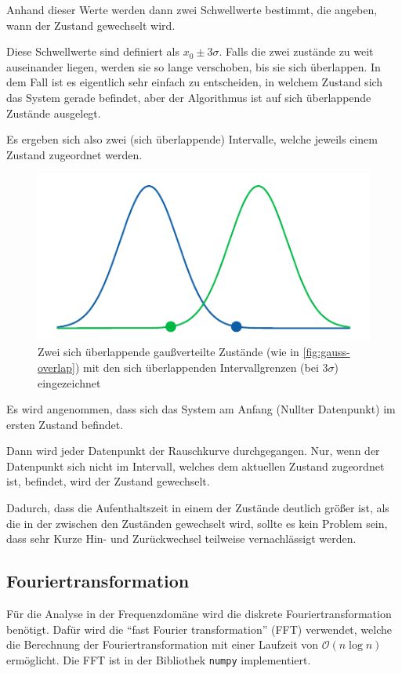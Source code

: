 \documentclass[main.tex]{subfiles}
\begin{document}
Anhand dieser Werte werden dann zwei Schwellwerte bestimmt, die angeben, wann der Zustand gewechselt wird.

Diese Schwellwerte sind definiert als \(x_0 \pm 3\sigma\). Falls die zwei zustände zu weit auseinander liegen, werden sie so lange verschoben, bis sie sich überlappen. 
In dem Fall ist es eigentlich sehr einfach zu entscheiden, in welchem Zustand sich das System gerade befindet, aber der Algorithmus ist auf sich überlappende Zustände ausgelegt.

Es ergeben sich also zwei (sich überlappende) Intervalle, welche jeweils einem Zustand zugeordnet werden.

\begin{figure}[h]
    \centering
    \includegraphics{bilder/plots/theo-vis/bounds.pdf}
    \caption{Zwei sich überlappende gaußverteilte Zustände (wie in \cref{fig:gauss-overlap}) mit den sich überlappenden Intervallgrenzen (bei \(3\sigma\)) eingezeichnet }
\end{figure}


Es wird angenommen, dass sich das System am Anfang (Nullter Datenpunkt) im ersten Zustand befindet.

Dann wird jeder Datenpunkt der Rauschkurve durchgegangen. Nur, wenn der Datenpunkt sich nicht im Intervall, welches dem aktuellen Zustand zugeordnet ist, befindet, wird der Zustand gewechselt. 

Dadurch, dass die Aufenthaltszeit in einem der Zustände deutlich größer ist, als die in der zwischen den Zuständen gewechselt wird, sollte es kein Problem sein, dass sehr Kurze Hin- und Zurückwechsel teilweise vernachlässigt werden. 

\subsection{Fouriertransformation}

Für die Analyse in der Frequenzdomäne wird die diskrete Fouriertransformation
benötigt. Dafür wird die \enquote{fast Fourier transformation} (FFT) verwendet,
welche die Berechnung der Fouriertransformation mit einer Laufzeit von
$\mathcal{O}(n \log n)$ ermöglicht. Die FFT ist in der Bibliothek
\texttt{numpy} \cite{numpy-fft} implementiert.
\end{document}
